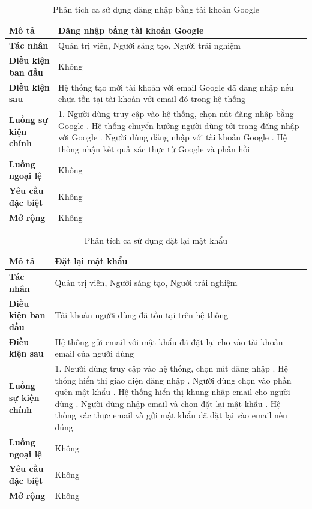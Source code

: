 \begin{table}
\centering
\caption{Phân tích ca sử dụng đăng nhập bằng tài khoản Google}
\begin{tabular}{|p{4cm}|p{10cm}|}
    \hline
\textbf{Mô tả} & Đăng nhập bằng tài khoản Google \\ \hline
\textbf{Tác nhân} & Quản trị viên, Người sáng tạo, Người trải nghiệm \\ \hline
\textbf{Điều kiện ban đầu} & Không \\ \hline
\textbf{Điều kiện sau} & Hệ thống tạo mới tài khoản với email Google đã đăng nhập nếu chưa tồn tại tài khoản với email đó trong hệ thống \\ \hline
\textbf{Luồng sự kiện chính} & 
1. Người dùng truy cập vào hệ thống, chọn nút đăng nhập bằng Google \newline
2. Hệ thống chuyển hướng người dùng tới trang đăng nhập với Google \newline
3. Người dùng đăng nhập với tài khoản Google \newline
4. Hệ thống nhận kết quả xác thực từ Google và phản hồi \\ \hline
\textbf{Luồng ngoại lệ} & Không \\ \hline
\textbf{Yêu cầu đặc biệt} & Không \\ \hline
\textbf{Mở rộng} & Không \\ \hline
\end{tabular}
\end{table}

\begin{table}
\centering
\caption{Phân tích ca sử dụng đặt lại mật khẩu}
\begin{tabular}{|p{4cm}|p{10cm}|}
    \hline
\textbf{Mô tả} & Đặt lại mật khẩu \\ \hline
\textbf{Tác nhân} & Quản trị viên, Người sáng tạo, Người trải nghiệm \\ \hline
\textbf{Điều kiện ban đầu} & Tài khoản người dùng đã tồn tại trên hệ thống \\ \hline
\textbf{Điều kiện sau} & Hệ thống gửi email với mật khẩu đã đặt lại cho vào tài khoản email của người dùng \\ \hline
\textbf{Luồng sự kiện chính} & 
1. Người dùng truy cập vào hệ thống, chọn nút đăng nhập \newline
2. Hệ thống hiển thị giao diện đăng nhập \newline
3. Người dùng chọn vào phần quên mật khẩu \newline
4. Hệ thống hiển thị khung nhập email cho người dùng \newline
5. Người dùng nhập email và chọn đặt lại mật khẩu \newline
6. Hệ thống xác thực email và gửi mật khẩu đã đặt lại vào email nếu đúng \\ \hline
\textbf{Luồng ngoại lệ} & Không \\ \hline
\textbf{Yêu cầu đặc biệt} & Không \\ \hline
\textbf{Mở rộng} & Không \\ \hline
\end{tabular}
\end{table}

